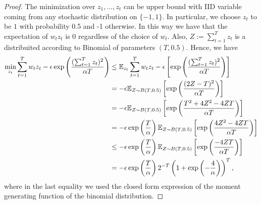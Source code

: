 \begin{proof}
The minimization over $z_1,\ldots, z_t$ can be upper bound with IID variable coming from any stochastic distribution on $\{-1,1\}$. In particular, we choose $z_t$ to be $1$ with probability 0.5 and -1 otherwise. In this way we have that the expectation of $w_t z_t$ is 0 regardless of the choice of $w_t$.
Also, $Z:=\sum_{t=1}^T z_t$ is a distribuited according to Binomial of parameters $(T,0.5)$.
Hence, we have
\begin{align*}
\min_{z_t} \sum_{t=1}^T w_t z_t - \epsilon \exp\left(\frac{(\sum_{t=1}^T z_t)^2}{\alpha T}\right) 
&\leq \mathbb{E}_{z_t} \sum_{t=1}^T w_t z_t -\epsilon \left[\exp\left(\frac{(\sum_{t=1}^T z_t)^2}{\alpha T}\right)\right] \\
&= -\epsilon \mathbb{E}_{Z \sim B(T,0.5)} \left[\exp\left(\frac{(2 Z-T)^2}{\alpha T}\right)\right] \\
& =-\epsilon \mathbb{E}_{Z\sim B(T,0.5)} \left[\exp\left(\frac{T^2 + 4 Z^2 - 4 Z T }{\alpha T}\right)\right] \\
& =-\epsilon \exp\left(\frac{T}{\alpha}\right) \mathbb{E}_{Z\sim B(T,0.5)} \left[\exp\left(\frac{4 Z^2 - 4 Z T }{\alpha T}\right)\right] \\
& \leq - \epsilon \exp\left(\frac{T}{\alpha}\right) \mathbb{E}_{Z\sim B(T,0.5)} \left[\exp\left(\frac{- 4 Z T }{\alpha T}\right)\right] \\
& =- \epsilon \exp\left(\frac{T}{\alpha}\right) 2^{-T} \left(1+\exp\left(-\frac{4}{\alpha}\right)\right)^T,
\end{align*}
where in the last equality we used the closed form expression of the moment generating function of the binomial distribution.

\end{proof}
